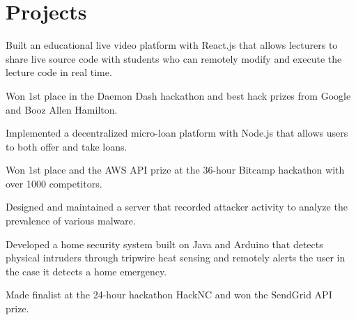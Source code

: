 \documentclass[]{template}
\begin{document}
\section{Projects}
\begin{tightemize}
\item Built an educational live video platform with React.js that allows lecturers to share live source code with students who can remotely modify and execute the lecture code in real time.
\item Won 1st place in the Daemon Dash hackathon and best hack prizes from Google and Booz Allen Hamilton.
\end{tightemize}
\sectionsep

\begin{tightemize}
\item Implemented a decentralized micro-loan platform with Node.js that allows users to both offer and take loans.
\item Won 1st place and the AWS API prize at the 36-hour Bitcamp hackathon with over 1000 competitors.
\end{tightemize}
\sectionsep

\descript{}
\begin{tightemize}
\item Designed and maintained a server that recorded attacker activity to analyze the prevalence of various malware.
\end{tightemize}
\sectionsep

\begin{tightemize}
\item Developed a home security system built on Java and Arduino that detects physical intruders through tripwire heat sensing and remotely alerts the user in the case it detects a home emergency.
\item Made finalist at the 24-hour hackathon HackNC and won the SendGrid API prize.
\end{tightemize}
\sectionsep
\end{document}

